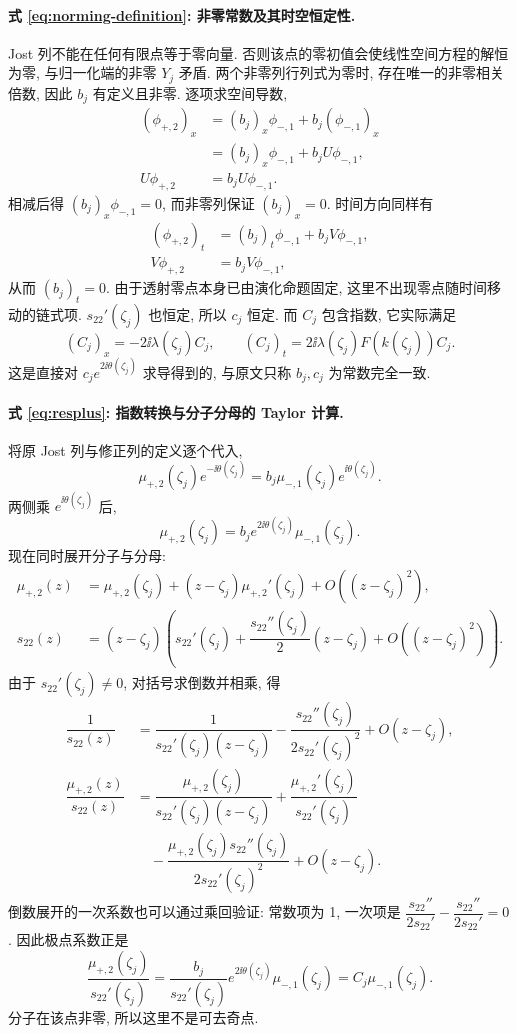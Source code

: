\paragraph{式 \eqref{eq:norming-definition}: 非零常数及其时空恒定性.}
Jost 列不能在任何有限点等于零向量.
否则该点的零初值会使线性空间方程的解恒为零,
与归一化端的非零 $Y_j$ 矛盾.
两个非零列行列式为零时, 存在唯一的非零相关倍数,
因此 $b_j$ 有定义且非零.
逐项求空间导数,
\begin{align*}
(\phi_{+,2})_x
&=(b_j)_x\phi_{-,1}+b_j(\phi_{-,1})_x\\
&=(b_j)_x\phi_{-,1}+b_jU\phi_{-,1},\\
U\phi_{+,2}&=b_jU\phi_{-,1}.
\end{align*}
相减后得 $(b_j)_x\phi_{-,1}=0$,
而非零列保证 $(b_j)_x=0$.
时间方向同样有
\begin{align*}
(\phi_{+,2})_t
&=(b_j)_t\phi_{-,1}+b_jV\phi_{-,1},\\
V\phi_{+,2}&=b_jV\phi_{-,1},
\end{align*}
从而 $(b_j)_t=0$.
由于透射零点本身已由演化命题固定,
这里不出现零点随时间移动的链式项.
$s_{22}'(\zeta_j)$ 也恒定, 所以 $c_j$ 恒定.
而 $C_j$ 包含指数, 它实际满足
\[
(C_j)_x=-2\ii\lambda(\zeta_j)C_j,
\qquad
(C_j)_t=2\ii\lambda(\zeta_j)F(k(\zeta_j))C_j.
\]
这是直接对 $c_je^{2\ii\theta(\zeta_j)}$ 求导得到的,
与原文只称 $b_j,c_j$ 为常数完全一致.

\paragraph{式 \eqref{eq:resplus}: 指数转换与分子分母的 Taylor 计算.}
将原 Jost 列与修正列的定义逐个代入,
\[
\mu_{+,2}(\zeta_j)e^{-\ii\theta(\zeta_j)}
=b_j\mu_{-,1}(\zeta_j)e^{\ii\theta(\zeta_j)}.
\]
两侧乘 $e^{\ii\theta(\zeta_j)}$ 后,
\[
\mu_{+,2}(\zeta_j)
=b_je^{2\ii\theta(\zeta_j)}\mu_{-,1}(\zeta_j).
\]
现在同时展开分子与分母:
\begin{align*}
\mu_{+,2}(z)
&=\mu_{+,2}(\zeta_j)+(z-\zeta_j)\mu_{+,2}'(\zeta_j)
+O((z-\zeta_j)^2),\\
s_{22}(z)
&=(z-\zeta_j)\left(s_{22}'(\zeta_j)
+\dfrac{s_{22}''(\zeta_j)}{2}(z-\zeta_j)
+O((z-\zeta_j)^2)\right).
\end{align*}
由于 $s_{22}'(\zeta_j)\ne0$, 对括号求倒数并相乘, 得
\begin{align*}
\dfrac{1}{s_{22}(z)}
&=\dfrac{1}{s_{22}'(\zeta_j)(z-\zeta_j)}
-\dfrac{s_{22}''(\zeta_j)}{2s_{22}'(\zeta_j)^2}
+O(z-\zeta_j),\\
\dfrac{\mu_{+,2}(z)}{s_{22}(z)}
&=\dfrac{\mu_{+,2}(\zeta_j)}{s_{22}'(\zeta_j)(z-\zeta_j)}
+\dfrac{\mu_{+,2}'(\zeta_j)}{s_{22}'(\zeta_j)}\\
&\quad-\dfrac{\mu_{+,2}(\zeta_j)s_{22}''(\zeta_j)}{2s_{22}'(\zeta_j)^2}
+O(z-\zeta_j).
\end{align*}
倒数展开的一次系数也可以通过乘回验证:
常数项为 1, 一次项是
$\dfrac{s_{22}''}{2s_{22}'}-\dfrac{s_{22}''}{2s_{22}'}=0$.
因此极点系数正是
\[
\dfrac{\mu_{+,2}(\zeta_j)}{s_{22}'(\zeta_j)}
=\dfrac{b_j}{s_{22}'(\zeta_j)}e^{2\ii\theta(\zeta_j)}
\mu_{-,1}(\zeta_j)=C_j\mu_{-,1}(\zeta_j).
\]
分子在该点非零, 所以这里不是可去奇点.

